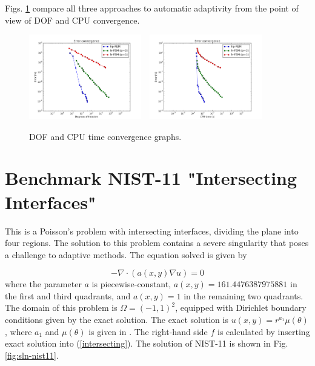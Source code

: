 \documentclass[12pt]{elsarticle}
\begin{document}
Figs. \ref{fig:nist-10-conv} compare all
three approaches to automatic adaptivity from the point
of view of DOF and CPU convergence.

\begin{figure}[H]
\centering
\vspace{-5mm}
\includegraphics[height=3.7cm]{nist/nist-10/conv_dof_aniso.png}\ \
\includegraphics[height=3.7cm]{nist/nist-10/conv_cpu_aniso.png}
\vspace{-5mm}
\caption{DOF and CPU time convergence graphs.}
\vspace{-5mm}
\label{fig:nist-10-conv}
\end{figure}


\section{Benchmark NIST-11 "Intersecting Interfaces"}
\label{sec:bench-11}

This is a Poisson's problem with intersecting interfaces,
dividing the plane into four regions.
The solution to this problem contains a severe
singularity that poses a challenge to adaptive methods.
The equation solved is given by

\begin{equation} \label{intersecting}
-\nabla \cdot (a(x,y) \nabla u) = 0
\end{equation}
where the parameter $a$ is piecewise-constant,
$a(x,y) = 161.4476387975881$ in the first and third quadrants,
and $a(x,y) = 1$ in the remaining two quadrants.
The domain of this problem is $\Omega = (-1, 1)^2$, equipped with
Dirichlet boundary conditions given by the exact solution.
The exact solution is
$u(x,y) = r^{a_1} \mu (\theta)$,
where $a_1$ and $\mu (\theta)$ is given in \cite{mitchell-1}.
The right-hand side $f$ is calculated by inserting exact solution into (\ref{intersecting}).
The solution of NIST-11 is shown in Fig. \ref{fig:sln-nist11}.
\end{document}
